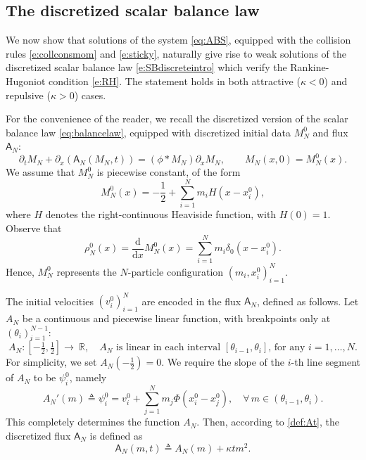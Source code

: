 \documentclass[10pt,a4paper]{amsart}
\def\R{\mathbb{R}}
\def\dd{\mathrm{d}}
\def\pa{\partial}
\def\A{\mathsf{A}}
\begin{document}
	
	\subsection{The discretized scalar balance law}\label{sec:discrete}
	We now show that solutions of the system \eqref{eq:ABS}, equipped with the collision rules \eqref{e:collconsmom} and \eqref{e:sticky}, naturally give rise to weak solutions of the discretized scalar balance law \eqref{e:SBdiscreteintro} which verify the Rankine-Hugoniot condition \eqref{e:RH}.  The statement holds in both attractive ($\kappa<0$) and repulsive ($\kappa>0$) cases.  
	
	
	
	For the convenience of the reader, we recall the discretized version of the scalar balance law \eqref{eq:balancelaw}, equipped with discretized initial data $M_N^0$ and flux $\A_N$:
	\begin{equation}
		\label{eq:MN}
		\pa_t M_N + \pa_x(\A_N(M_N,t)) = (\phi\ast M_N) \pa_x M_N, \qquad
		M_N(x,0)=M_N^0(x).
	\end{equation}
	We assume that $M_N^0$ is piecewise constant, of the form
	\begin{equation}
		\label{eq:MN0}
		M_N^0(x) = -\frac12 + \sum_{i=1}^{N} m_i H(x - x_i^0),
	\end{equation}
	where $H$ denotes the right-continuous Heaviside function, with $H(0) =1$. Observe that
	\[
	\rho_N^0(x) = \frac{\dd}{\dd x} M_N^0(x) = \sum_{i=1}^{N} m_i \delta_0( x-x_i^0).
	\]
	Hence, $M^0_N$ represents the $N$-particle configuration $(m_i,x_i^0)_{i=1}^N$. 
	
	The initial velocities $(v_i^0)_{i=1}^N$ are encoded in the flux $\A_N$, defined as follows.
	Let $A_N$ be a continuous and piecewise linear function, with breakpoints only at $(\theta_i)_{i=1}^{N-1}$:
	\begin{equation}\label{eq:AN}
		A_N:[-\tfrac12,\tfrac12]\to~\R,\quad
		\text{$A_N$ is linear in each interval $[\theta_{i-1}, \theta_i]$, for any
			$i=1,\ldots,N$.}
	\end{equation}
	For simplicity, we set $A_N(-\frac12)=0$. We require the slope of the $i$-th line segment of $A_N$ to be $\psi_i^0$, namely
	\begin{equation}\label{eq:psi0}
		A_N'(m) \triangleq \psi_i^0 = v_i^0 + \sum_{j=1}^{N} m_j \Phi(x_i^0 - x_j^0),\quad \forall\, m\in(\theta_{i-1}, \theta_i).
	\end{equation}
	This completely determines the function $A_N$. Then, according to \eqref{def:At}, the discretized flux $\A_N$ is defined as
	\begin{equation}\label{def:AN}
		\A_N(m,t) \triangleq A_N(m)+\kappa t m^2. 
	\end{equation}
	
\end{document}
